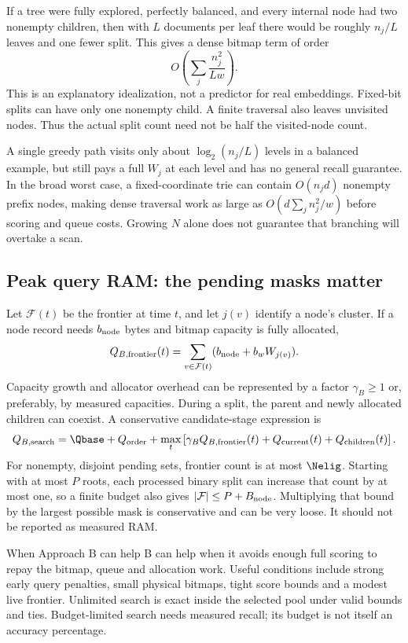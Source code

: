 If a tree were fully explored, perfectly balanced, and every internal node had two nonempty
children, then with $L$ documents per leaf there would be roughly $n_j/L$ leaves and one fewer
split. This gives a dense bitmap term of order
\begin{equation}
O\!\left(\sum_j\frac{n_j^2}{Lw}\right).
\label{eq:balanced-branch}
\end{equation}
This is an explanatory idealization, not a predictor for real embeddings. Fixed-bit splits can
have only one nonempty child. A finite traversal also leaves unvisited nodes. Thus the actual
split count need not be half the visited-node count.

A single greedy path visits only about $\log_2(n_j/L)$ levels in a balanced example, but still
pays a full $W_j$ at each level and has no general recall guarantee. In the broad worst case,
a fixed-coordinate trie can contain $O(n_jd)$ nonempty prefix nodes, making dense traversal
work as large as $O(d\sum_j n_j^2/w)$ before scoring and queue costs. Growing $N$ alone does
not guarantee that branching will overtake a scan.

\subsection{Peak query RAM: the pending masks matter}
Let $\mathcal F(t)$ be the frontier at time $t$, and let $j(v)$ identify a node's cluster.
If a node record needs $b_{\rm node}$ bytes and bitmap capacity is fully allocated,
\begin{equation}
Q_{B,\rm frontier}(t)=\sum_{v\in\mathcal F(t)}(b_{\rm node}+b_wW_{j(v)}).
\label{eq:frontier-memory}
\end{equation}
Capacity growth and allocator overhead can be represented by a factor $\gamma_B\geq1$ or,
preferably, by measured capacities. During a split, the parent and newly allocated children
can coexist. A conservative candidate-stage expression is
\begin{equation}
Q_{B,\rm search}=\Qbase+Q_{\rm order}
 +\max_t\left[\gamma_B Q_{B,\rm frontier}(t)+Q_{\rm current}(t)+Q_{\rm children}(t)\right].
\label{eq:branch-ram}
\end{equation}
For nonempty, disjoint pending sets, frontier count is at most $\Nelig$. Starting with at most
$P$ roots, each processed binary split can increase that count by at most one, so a finite
budget also gives $|\mathcal F|\leq P+B_{\rm node}$. Multiplying that bound by the largest
possible mask is conservative and can be very loose. It should not be reported as measured RAM.

\begin{resultbox}{When Approach B can help}
B can help when it avoids enough full scoring to repay the bitmap, queue and allocation work.
Useful conditions include strong early query penalties, small physical bitmaps, tight score
bounds and a modest live frontier. Unlimited search is exact inside the selected pool under
valid bounds and ties. Budget-limited search needs measured recall; its budget is not itself
an accuracy percentage.
\end{resultbox}
